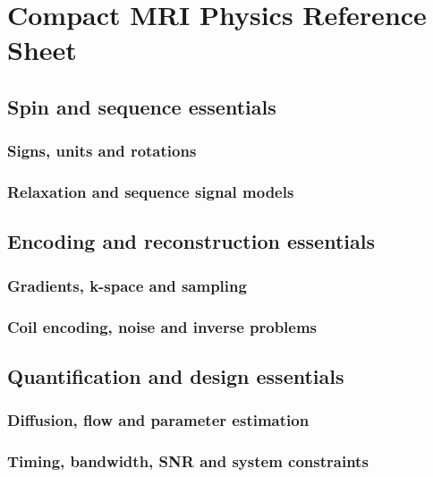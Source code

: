\chapter{Compact MRI Physics Reference Sheet}
\label{app:f}

\section{Spin and sequence essentials}
\label{sec:f:spin-and-sequence-essentials}
\subsection{Signs, units and rotations}
\subsection{Relaxation and sequence signal models}

\section{Encoding and reconstruction essentials}
\label{sec:f:encoding-and-reconstruction-essentials}
\subsection{Gradients, k-space and sampling}
\subsection{Coil encoding, noise and inverse problems}

\section{Quantification and design essentials}
\label{sec:f:quantification-and-design-essentials}
\subsection{Diffusion, flow and parameter estimation}
\subsection{Timing, bandwidth, SNR and system constraints}
